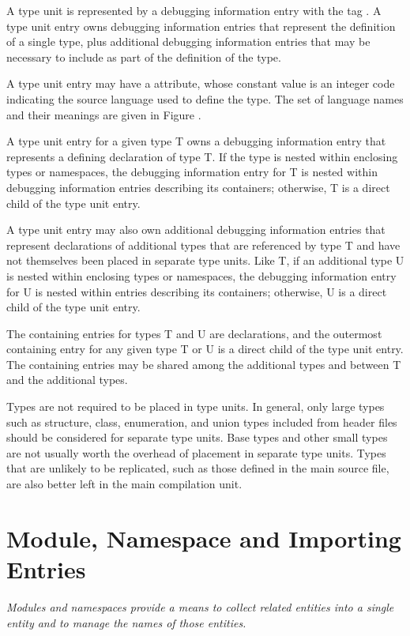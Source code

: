A type unit is represented by a debugging information entry
with the tag . 
A type unit entry owns debugging
information entries that represent the definition of a single
type, plus additional debugging information entries that may
be necessary to include as part of the definition of the type.

A type unit entry may have a  attribute, whose
constant value is an integer code indicating the source
language used to define the type. The set of language names
and their meanings are given in Figure .

A type unit entry for a given type T owns a debugging
information entry that represents a defining declaration
of type T. If the type is nested within enclosing types or
namespaces, the debugging information entry for T is nested
within debugging information entries describing its containers;
otherwise, T is a direct child of the type unit entry.

A type unit entry may also own additional debugging information
entries that represent declarations of additional types that
are referenced by type T and have not themselves been placed in
separate type units. Like T, if an additional type U is nested
within enclosing types or namespaces, the debugging information
entry for U is nested within entries describing its containers;
otherwise, U is a direct child of the type unit entry.

The containing entries for types T and U are declarations,
and the outermost containing entry for any given type T or
U is a direct child of the type unit entry. The containing
entries may be shared among the additional types and between
T and the additional types.

Types are not required to be placed in type units. In general,
only large types such as structure, class, enumeration, and
union types included from header files should be considered
for separate type units. Base types and other small types
are not usually worth the overhead of placement in separate
type units. Types that are unlikely to be replicated, such
as those defined in the main source file, are also better
left in the main compilation unit.

\section{Module, Namespace and Importing Entries}
\textit{Modules and namespaces provide a means to collect related
entities into a single entity and to manage the names of
those entities.}

